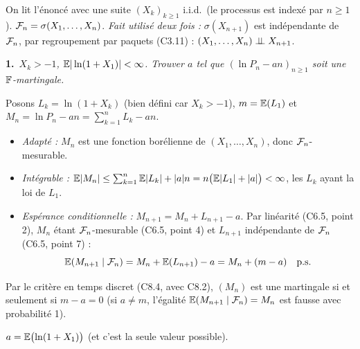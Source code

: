 \documentclass[11pt,a4paper]{article}
\newcommand{\question}[2]{\par\medskip\noindent\textbf{#1}~\textit{#2}\par\smallskip}
\begin{document}
\begin{exo}
On lit l'énoncé avec une suite $(X_k)_{k\ge1}$ i.i.d.\ (le processus est indexé par $n\ge1$). $\mathcal{F}_n=\sigma(X_1,\dots,X_n)$.
\emph{Fait utilisé deux fois :} $\sigma(X_{n+1})$ est indépendante de $\mathcal{F}_n$, par regroupement par paquets (C3.11) :
$(X_1,\dots,X_n)\perp\!\!\!\perp X_{n+1}$.

\question{1.}{$X_k>-1$, $\mathbb{E}|\ln(1+X_1)|<\infty$. Trouver $a$ tel que $(\ln P_n-an)_{n\ge1}$ soit une $\mathbb{F}$-martingale.}
Posons $L_k=\ln(1+X_k)$ (bien défini car $X_k>-1$), $m=\mathbb{E}(L_1)$ et $M_n=\ln P_n-an=\sum_{k=1}^nL_k-an$.
\begin{itemize}
  \item \emph{Adapté :} $M_n$ est une fonction borélienne de $(X_1,\dots,X_n)$, donc $\mathcal{F}_n$-mesurable.
  \item \emph{Intégrable :} $\mathbb{E}|M_n|\le\sum_{k=1}^n\mathbb{E}|L_k|+|a|n=n\bigl(\mathbb{E}|L_1|+|a|\bigr)<\infty$, les $L_k$ ayant la loi de $L_1$.
  \item \emph{Espérance conditionnelle :} $M_{n+1}=M_n+L_{n+1}-a$. Par linéarité (C6.5, point 2), $M_n$ étant $\mathcal{F}_n$-mesurable
  (C6.5, point 4) et $L_{n+1}$ indépendante de $\mathcal{F}_n$ (C6.5, point 7) :
  \[\mathbb{E}(M_{n+1}\mid\mathcal{F}_n)=M_n+\mathbb{E}(L_{n+1})-a=M_n+(m-a)\quad\text{p.s.}\]
\end{itemize}
Par le critère en temps discret (C8.4, avec C8.2), $(M_n)$ est une martingale si et seulement si $m-a=0$ (si $a\neq m$, l'égalité
$\mathbb{E}(M_{n+1}\mid\mathcal{F}_n)=M_n$ est fausse avec probabilité 1).
\begin{resultat}$a=\mathbb{E}\bigl(\ln(1+X_1)\bigr)$ (et c'est la seule valeur possible).\end{resultat}


\end{exo}
\end{document}
